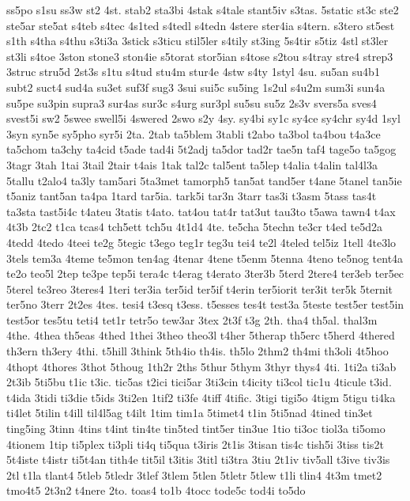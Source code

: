 {ss5po
s1su
ss3w
st2
4st.
stab2
sta3bi
4stak
s4tale
stant5iv
s3tas.
5static
st3c
ste2
ste5ar
ste5at
s4teb
s4tec
4s1ted
s4tedl
s4tedn
4stere
ster4ia
s4tern.
s3tero
st5est
s1th
s4tha
s4thu
s3ti3a
3stick
s3ticu
stil5ler
s4tily
st3ing
5s4tir
s5tiz
4stl
st3ler
st3li
s4toe
3ston
stone3
ston4ie
s5torat
stor5ian
s4tose
s2tou
s4tray
stre4
strep3
3struc
stru5d
2st3s
s1tu
s4tud
stu4m
stur4e
4stw
s4ty
1styl
4su.
su5an
su4b1
subt2
suct4
sud4a
su3et
suf3f
sug3
3sui
sui5c
su5ing
1s2ul
s4u2m
sum3i
sun4a
su5pe
su3pin
supra3
sur4as
sur3c
s4urg
sur3pl
su5su
su5z
2s3v
svers5a
sves4
svest5i
sw2
5swee
swell5i
4swered
2swo
s2y
4sy.
sy4bi
sy1c
sy4ce
sy4chr
sy4d
1syl
3syn
syn5e
sy5pho
syr5i
2ta.
2tab
ta5blem
3tabli
t2abo
ta3bol
ta4bou
t4a3ce
ta5chom
ta3chy
ta4cid
t5ade
tad4i
5t2adj
ta5dor
tad2r
tae5n
taf4
tage5o
ta5gog
3tagr
3tah
1tai
3tail
2tair
t4ais
1tak
tal2c
tal5ent
ta5lep
t4alia
t4alin
tal4l3a
5tallu
t2alo4
ta3ly
tam5ari
5ta3met
tamorph5
tan5at
tand5er
t4ane
5tanel
tan5ie
t5aniz
tant5an
ta4pa
1tard
tar5ia.
tark5i
tar3n
3tarr
tas3i
t3asm
5tass
tas4t
ta3sta
tast5i4c
t4ateu
3tatis
t4ato.
tat4ou
tat4r
tat3ut
tau3to
t5awa
tawn4
t4ax
4t3b
2tc2
t1ca
tcas4
tch5ett
tch5u
4t1d4
4te.
te5cha
5techn
te3cr
t4ed
te5d2a
4tedd
4tedo
4teei
te2g
5tegic
t3ego
teg1r
teg3u
tei4
te2l
4teled
tel5iz
1tell
4te3lo
3tels
tem3a
4teme
te5mon
ten4ag
4tenar
4tene
t5enm
5tenna
4teno
te5nog
tent4a
te2o
teo5l
2tep
te3pe
tep5i
tera4c
t4erag
t4erato
3ter3b
5terd
2tere4
ter3eb
ter5ec
5terel
te3reo
3teres4
1teri
ter3ia
ter5id
ter5if
t4erin
ter5iorit
ter3it
ter5k
5ternit
ter5no
3terr
2t2es
4tes.
tesi4
t3esq
t3ess.
t5esses
tes4t
test3a
5teste
test5er
test5in
test5or
tes5tu
teti4
tet1r
tetr5o
tew3ar
3tex
2t3f
t3g
2th.
tha4
th5al.
thal3m
4the.
4thea
th5eas
4thed
1thei
3theo
theo3l
t4her
5therap
th5erc
t5herd
4thered
th3ern
th3ery
4thi.
t5hill
3think
5th4io
th4is.
th5lo
2thm2
th4mi
th3oli
4t5hoo
4thopt
4thores
3thot
5thoug
1th2r
2ths
5thur
5thym
3thyr
thys4
4ti.
1ti2a
ti3ab
2t3ib
5ti5bu
t1ic
t3ic.
tic5as
t2ici
tici5ar
3ti3cin
t4icity
ti3col
tic1u
4ticule
t3id.
t4ida
3tidi
ti3die
t5ids
3ti2en
1tif2
ti3fe
4tiff
4tific.
3tigi
tigi5o
4tigm
5tigu
ti4ka
ti4let
5tilin
t4ill
til4l5ag
t4ilt
1tim
tim1a
5timet4
t1in
5ti5nad
4tined
tin3et
ting5ing
3tinn
4tins
t4int
tin4te
tin5ted
tint5er
tin3ue
1tio
ti3oc
tiol3a
ti5omo
4tionem
1tip
ti5plex
ti3pli
ti4q
ti5qua
t3iris
2t1is
3tisan
tis4c
tish5i
3tiss
tis2t
5t4iste
t4istr
ti5t4an
tith4e
tit5il
t3itis
3titl
ti3tra
3tiu
2t1iv
tiv5all
t3ive
tiv3is
2tl
t1la
tlant4
5tleb
5tledr
3tlef
3tlem
5tlen
5tletr
5tlew
t1li
tlin4
4t3m
tmet2
tmo4t5
2t3n2
t4nere
2to.
toas4
to1b
4tocc
tode5c
tod4i
to5do
}
